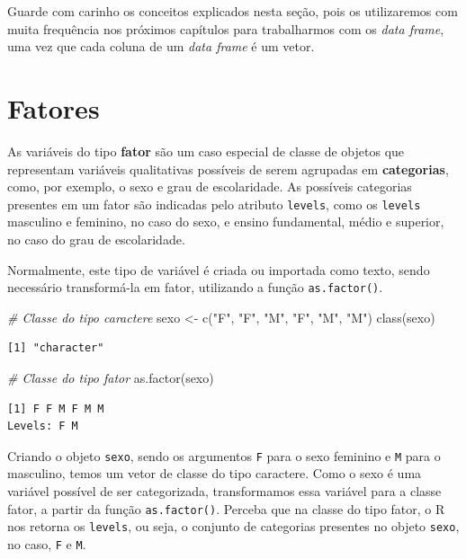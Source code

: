 \documentclass[
  brazilian,
]{book}
\newenvironment{Shaded}{\begin{snugshade}}{\end{snugshade}}
\newcommand{\CommentTok}[1]{\textcolor[rgb]{0.56,0.35,0.01}{\textit{#1}}}
\newcommand{\FunctionTok}[1]{\textcolor[rgb]{0.00,0.00,0.00}{#1}}
\newcommand{\NormalTok}[1]{#1}
\newcommand{\OtherTok}[1]{\textcolor[rgb]{0.56,0.35,0.01}{#1}}
\newcommand{\StringTok}[1]{\textcolor[rgb]{0.31,0.60,0.02}{#1}}
\begin{document}
Guarde com carinho os conceitos explicados nesta seção, pois os utilizaremos com muita frequência nos próximos capítulos para trabalharmos com os \emph{data frame}, uma vez que cada coluna de um \emph{data frame} é um vetor.

\hypertarget{fator}{%
\section{Fatores}\label{fator}}

As variáveis do tipo \textbf{fator} são um caso especial de classe de objetos que representam variáveis qualitativas possíveis de serem agrupadas em \textbf{categorias}, como, por exemplo, o sexo e grau de escolaridade. As possíveis categorias presentes em um fator são indicadas pelo atributo \texttt{levels}, como os \texttt{levels} masculino e feminino, no caso do sexo, e ensino fundamental, médio e superior, no caso do grau de escolaridade.

Normalmente, este tipo de variável é criada ou importada como texto, sendo necessário transformá-la em fator, utilizando a função \texttt{as.factor()}.

\begin{Shaded}
\begin{Highlighting}[]
\CommentTok{\# Classe do tipo caractere}
\NormalTok{sexo }\OtherTok{\textless{}{-}} \FunctionTok{c}\NormalTok{(}\StringTok{"F"}\NormalTok{, }\StringTok{"F"}\NormalTok{, }\StringTok{"M"}\NormalTok{, }\StringTok{"F"}\NormalTok{, }\StringTok{"M"}\NormalTok{, }\StringTok{"M"}\NormalTok{)}
\FunctionTok{class}\NormalTok{(sexo)}
\end{Highlighting}
\end{Shaded}

\begin{verbatim}
[1] "character"
\end{verbatim}

\begin{Shaded}
\begin{Highlighting}[]
\CommentTok{\# Classe do tipo fator}
\FunctionTok{as.factor}\NormalTok{(sexo)}
\end{Highlighting}
\end{Shaded}

\begin{verbatim}
[1] F F M F M M
Levels: F M
\end{verbatim}

Criando o objeto \texttt{sexo}, sendo os argumentos \texttt{F} para o sexo feminino e \texttt{M} para o masculino, temos um vetor de classe do tipo caractere. Como o sexo é uma variável possível de ser categorizada, transformamos essa variável para a classe fator, a partir da função \texttt{as.factor()}. Perceba que na classe do tipo fator, o R nos retorna os \texttt{levels}, ou seja, o conjunto de categorias presentes no objeto \texttt{sexo}, no caso, \texttt{F} e \texttt{M}.
\end{document}
